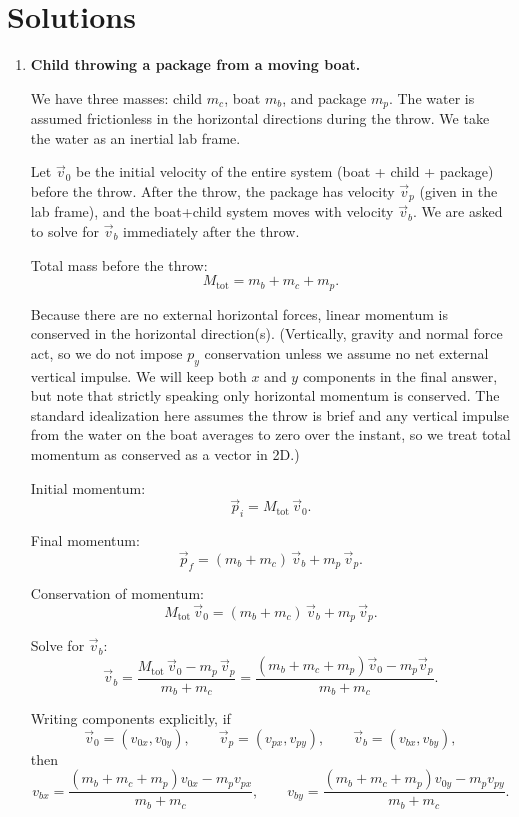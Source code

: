 \documentclass[../main.tex]{subfiles}
\begin{document}
\maketitle

\section*{Solutions}

\begin{enumerate}

\item \textbf{Child throwing a package from a moving boat.}

We have three masses: child $m_c$, boat $m_b$, and package $m_p$. The water is assumed frictionless in the horizontal directions during the throw. We take the water as an inertial lab frame.

Let $\vec{v}_0$ be the initial velocity of the entire system (boat + child + package) before the throw. After the throw, the package has velocity $\vec{v}_p$ (given in the lab frame), and the boat+child system moves with velocity $\vec{v}_b$. We are asked to solve for $\vec{v}_b$ immediately after the throw.

Total mass before the throw:
\[
M_{\text{tot}} = m_b + m_c + m_p.
\]

Because there are no external horizontal forces, linear momentum is conserved in the horizontal direction(s). (Vertically, gravity and normal force act, so we do not impose $p_y$ conservation unless we assume no net external vertical impulse. We will keep both $x$ and $y$ components in the final answer, but note that strictly speaking only horizontal momentum is conserved. The standard idealization here assumes the throw is brief and any vertical impulse from the water on the boat averages to zero over the instant, so we treat total momentum as conserved as a vector in 2D.)

Initial momentum:
\[
\vec{p}_i = M_{\text{tot}} \, \vec{v}_0.
\]

Final momentum:
\[
\vec{p}_f = (m_b + m_c)\, \vec{v}_b + m_p \, \vec{v}_p.
\]

Conservation of momentum:
\[
M_{\text{tot}} \, \vec{v}_0 = (m_b + m_c)\, \vec{v}_b + m_p \, \vec{v}_p.
\]

Solve for $\vec{v}_b$:
\[
\vec{v}_b
= \frac{M_{\text{tot}} \, \vec{v}_0 - m_p \, \vec{v}_p}{m_b + m_c}
= \frac{(m_b + m_c + m_p)\vec{v}_0 - m_p \vec{v}_p}{m_b + m_c}.
\]

Writing components explicitly, if
\[
\vec{v}_0 = (v_{0x}, v_{0y}), 
\qquad
\vec{v}_p = (v_{px}, v_{py}),
\qquad
\vec{v}_b = (v_{bx}, v_{by}),
\]
then
\[
v_{bx}
= \frac{(m_b + m_c + m_p) v_{0x} - m_p v_{px}}{m_b + m_c},
\qquad
v_{by}
= \frac{(m_b + m_c + m_p) v_{0y} - m_p v_{py}}{m_b + m_c}.
\]


\end{enumerate}
\end{document}
